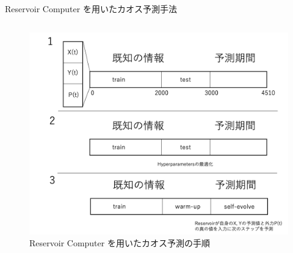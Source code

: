 \begin{frame}{Reservoir Computer を用いたカオス予測手法}
\begin{columns}[T]
        \begin{column}{.5\textwidth}
        \begin{figure}
            \includegraphics[width=\textwidth]{Fig/please.png}
            \caption{\scriptsize{Reservoir Computer を用いたカオス予測の手順}}
        \end{figure}   
        \end{column}
    \end{columns}
    \end{frame}

